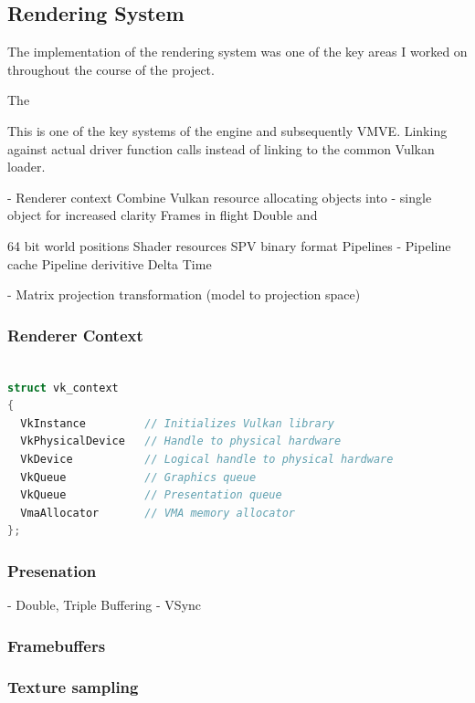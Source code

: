 \documentclass[11pt]{article}
\begin{document}
\subsection{Rendering System}

The implementation of the rendering system was one of the key areas
I worked on throughout the course of the project.

The 

This is one of the key systems of the engine and subsequently VMVE.
 Linking against actual driver function calls instead of linking to
 the common Vulkan loader.  \cite{volk}

- Renderer context Combine Vulkan resource allocating objects into
-   single object for increased clarity 
    Frames in flight 
    Double and

64 bit world positions 
Shader resources SPV binary format 
    Pipelines
-   Pipeline cache 
Pipeline derivitive 
Delta Time

- Matrix projection transformation (model to projection space)


\subsubsection{Renderer Context}
\begin{lstlisting}[language=C++]

struct vk_context
{
  VkInstance         // Initializes Vulkan library
  VkPhysicalDevice   // Handle to physical hardware
  VkDevice           // Logical handle to physical hardware
  VkQueue            // Graphics queue
  VkQueue            // Presentation queue
  VmaAllocator       // VMA memory allocator
};


\end{lstlisting}

\subsubsection{Presenation}

- Double, Triple Buffering
- VSync

\subsubsection{Framebuffers}

\subsubsection{Texture sampling}
\end{document}
